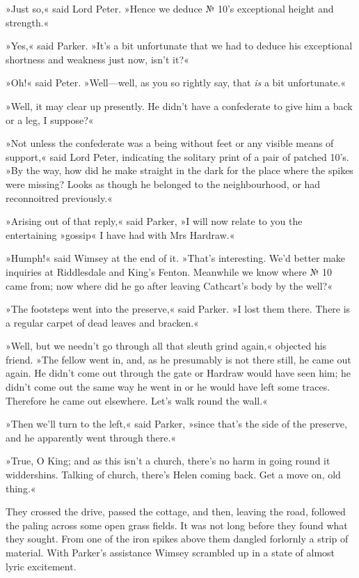 »Just so,« said Lord Peter. »Hence we deduce № 10's exceptional height and strength.«

»Yes,« said Parker. »It's a bit unfortunate that we had to deduce his exceptional shortness and weakness just now, isn't it?«

»Oh!« said Peter. »Well—well, as you so rightly say, that \textit{is} a bit unfortunate.«

»Well, it may clear up presently. He didn't have a confederate to give him a back or a leg, I suppose?«

»Not unless the confederate was a being without feet or any visible means of support,« said Lord Peter, indicating the solitary print of a pair of patched 10's. »By the way, how did he make straight in the dark for the place where the spikes were missing? Looks as though he belonged to the neighbourhood, or had reconnoitred previously.«

»Arising out of that reply,« said Parker, »I will now relate to you the entertaining »gossip« I have had with Mrs Hardraw.«

»Humph!« said Wimsey at the end of it. »That's interesting. We'd better make inquiries at Riddlesdale and King's Fenton. Meanwhile we know where № 10 came from; now where did he go after leaving Cathcart's body by the well?«

»The footsteps went into the preserve,« said Parker. »I lost them there. There is a regular carpet of dead leaves and bracken.«

»Well, but we needn't go through all that sleuth grind again,« objected his friend. »The fellow went in, and, as he presumably is not there still, he came out again. He didn't come out through the gate or Hardraw would have seen him; he didn't come out the same way he went in or he would have left some traces. Therefore he came out elsewhere.  Let's walk round the wall.«

»Then we'll turn to the left,« said Parker, »since that's the side of the preserve, and he apparently went through there.«

»True, O King; and as this isn't a church, there's no harm in going round it widdershins. Talking of church, there's Helen coming back. Get a move on, old thing.«

They crossed the drive, passed the cottage, and then, leaving the road, followed the paling across some open grass fields. It was not long before they found what they sought. From one of the iron spikes above them dangled forlornly a strip of material. With Parker's assistance Wimsey scrambled up in a state of almost lyric excitement.

